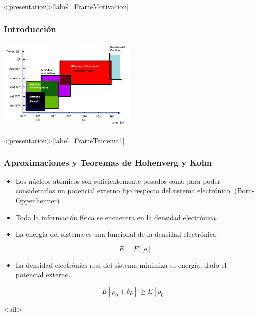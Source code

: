 %

\mode*
\begin{frame}<presentation>[label=FrameMotivacion]
  \frametitle{Introducción}

  \includegraphics[width=0.5\textwidth]{Figures/Escalas.png}

\end{frame}




\mode*
\begin{frame}<presentation>[label=FrameTeorema1]
 \frametitle{Aproximaciones y Teoremas de Hohenverg y Kohn}

 \begin{itemize}

   \item Los núcleos atómicos son suficientemente pesados como para poder considerarlos un potencial externo fijo respecto del sistema electrónico.
     (Born-Oppenheimer)

   \item Toda la información física se encuentra en la densidad electrónica.

   \item La energía del sistema es una funcional de la densidad electrónica.

     $$ E = E[\rho] $$

   \item La densidad electrónica real del sistema minimiza su energía, dado el potencial externo.

     $$ E[\rho_0 + \delta \rho ] \ge E[\rho_0]$$

 \end{itemize}

\end{frame}

\mode<all>
